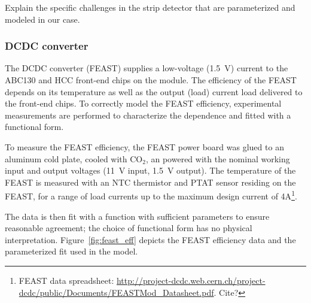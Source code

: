 
Explain the specific challenges in the strip detector that are parameterized and modeled
in our case.

\subsubsection{DCDC converter}

The DCDC converter (FEAST) supplies a low-voltage (1.5~V) current to the ABC130 and HCC front-end
chips on the module.
The efficiency of the FEAST depends on its temperature as well as the output (load) current
load delivered to the front-end chips. To correctly model the FEAST efficiency, experimental
measurements are performed to characterize the dependence and fitted with a functional form.

To measure the FEAST efficiency, the FEAST power board was glued to an aluminum cold plate, cooled
with CO$_2$, an powered with the nominal working input and output voltages (11~V input, 1.5~V output).
The temperature of the FEAST is measured with an NTC thermistor and PTAT sensor residing on the FEAST,
for a range of load currents up to the maximum design current of 4A\footnote
{
FEAST data spreadsheet: \url{http://project-dcdc.web.cern.ch/project-dcdc/public/Documents/FEASTMod_Datasheet.pdf}.
Cite?
}.

The data is then fit with a function with sufficient parameters to ensure reasonable agreement; the
choice of functional form has no physical interpretation. Figure~\ref{fig:feast_eff} depicts the
FEAST efficiency data and the parameterized fit used in the model.

